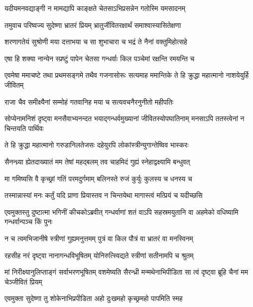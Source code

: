 \twolineshloka
{यदीयमनवद्याङ्गी न मामद्यापि काङ्क्षते}
{चेतसाऽभिप्रसन्नेन गतोस्मि यमसादनम्}



\twolineshloka
{तमुवाच परिष्वज्य सुदेष्णा भ्रातरं प्रियम्}
{भ्रातुर्जीवितरक्षार्थं समाश्वास्यासितेक्षणा}


\twolineshloka
{शरणागतेयं सुश्रोणी मया दत्ताभया च सा}
{शुभाचारा च भद्रं ते नैनां वक्तुमिहोत्सहे}


\twolineshloka
{एषा हि शक्या नान्येन स्प्रष्टुं पापेन चेतसा}
{गन्धर्वाः किल पञ्चेमां रक्षन्ति रमयन्ति च}


\threelineshloka
{एवमेषा ममाचष्टे तथा प्रथमसङ्गमे}
{तथैव गजनासोरूः सत्यमाह ममान्तिके}
{ते हि क्रुद्धा महात्मानो नाशयेयुर्हि जीवितम्}


\twolineshloka
{राजा चैव समीक्ष्यैनां सम्मोहं गतवानिह}
{मया च सत्यवचनैरनुनीतो महीपतिः}


\threelineshloka
{सोप्येनामनिशं दृष्ट्वा मनसैवाभ्यनन्दत}
{भयाद्गन्धर्वमुख्यानां जीवितस्योपघातिनाम्}
{मनसाऽपि ततस्त्वेनां न चिन्तयति पार्थिवः}


\twolineshloka
{ते हि क्रुद्धा महात्मानो गरुडानिलतेजसः}
{दहेयुरपि लोकांस्त्रीन्युगान्तेष्विव भास्करः}


\twolineshloka
{सैनन्ध्र्या ह्येतदाख्यातं मम तेषां महद्बलम्}
{तव चाहमिदं गुह्यं स्नेहाद्वक्ष्यामि बन्धुवत्}


\twolineshloka
{मा गमिष्यसि वै कृच्छ्रां गतिं परमदुर्गमाम्}
{बलिनस्ते रुजं कुर्युः कुलस्य च धनस्य च}


\twolineshloka
{तस्मान्नास्यां मनः कर्तुं यदि प्राणा प्रियास्तव}
{न चिन्तयेथा मागास्त्वं मत्प्रियं च यदीच्छसि}



\threelineshloka
{एवमुक्तस्तु दुष्टात्मा भगिनीं कीचकोऽब्रवीत्}
{गन्धर्वाणां शतं वाऽपि सहस्रमयुतानि वा}
{अहमेको वधिष्यामि गन्धर्वान्पञ्च किं पुनः}


\twolineshloka
{न च त्वमभिजानीषे स्त्रीणां गुह्यमनुत्तमम्}
{पुत्रं वा किल पौत्रं वा भ्रातरं वा मनस्विनम्}


\twolineshloka
{रहसीह नरं दृष्ट्वा नानागन्धविभूषितम्}
{योनिरुत्स्विद्यते स्त्रीणां सतीनामपि च श्रुतम्}


\threelineshloka
{मां निरीक्ष्यानुलिप्ताङ्गं सर्वाभरणभूषितम्}
{वशमेष्यति सैरन्ध्री मन्मथेनाभिपीडिता}
{सा त्वं दृष्ट्वा ब्रूहि चैनां मम चेञ्जीवितं प्रियम्}



\twolineshloka
{एवमुक्ता सुदेष्णा तु शोकेनाभिप्रपीडिता}
{अहो दुःखमहो कृच्छ्रमहो पापमिति स्मह}



